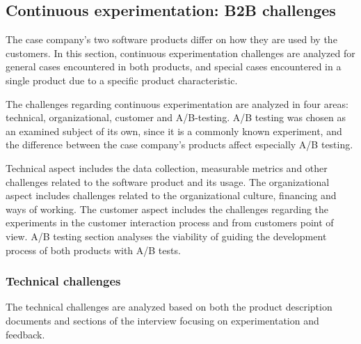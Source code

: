 \documentclass[english]{tktltiki2}
\theoremstyle{definition}
\theoremstyle{remark}
\begin{document}


\subsection{Continuous experimentation: B2B challenges}
The case company's two software products differ on how they are used by the customers. In this section, continuous experimentation challenges are analyzed for general cases encountered in both products, and special cases encountered in a single product due to a specific product characteristic. 

The challenges regarding continuous experimentation are analyzed in four areas: technical, organizational, customer and A/B-testing. A/B testing was chosen as an examined subject of its own, since it is a commonly known experiment, and the difference between the case company's products affect especially A/B testing.  

Technical aspect includes the data collection, measurable metrics and other challenges related to the software product and its usage. The organizational aspect includes challenges related to the organizational culture, financing and ways of working. The customer aspect includes the challenges regarding the experiments in the customer interaction process and from customers point of view. A/B testing section analyses the viability of guiding the development process of both products with A/B tests.
\subsubsection{Technical challenges}
The technical challenges are analyzed based on both the product description documents and sections of the interview focusing on experimentation and feedback.
\end{document}
